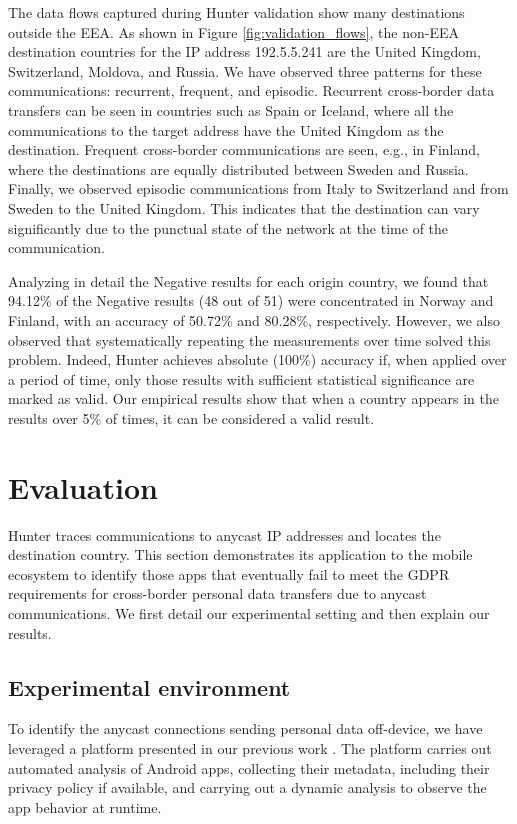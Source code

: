 \documentclass[preprint,12pt]{elsarticle}
\begin{document}
The data flows captured during Hunter validation show many destinations outside the EEA. As shown in Figure \ref{fig:validation_flows}, the non-EEA destination countries for the IP address 192.5.5.241 are the United Kingdom, Switzerland, Moldova, and Russia. We have observed three patterns for these communications: recurrent, frequent, and episodic. Recurrent cross-border data transfers can be seen in countries such as Spain or Iceland, where all the communications to the target address have the United Kingdom as the destination. Frequent cross-border communications are seen, e.g., in Finland, where the destinations are equally distributed between Sweden and Russia. Finally, we observed episodic communications from Italy to Switzerland and from Sweden to the United Kingdom. This indicates that the destination can vary significantly due to the punctual state of the network at the time of the communication. 

Analyzing in detail the Negative results for each origin country, we found that 94.12\% of the Negative results (48 out of 51) were concentrated in Norway and Finland, with an accuracy of 50.72\% and 80.28\%, respectively. However, we also observed that systematically repeating the measurements over time solved this problem. Indeed, Hunter achieves absolute (100\%) accuracy if, when applied over a period of time, only those results with sufficient statistical significance are marked as valid. Our empirical results show that when a country appears in the results over 5\% of times, it can be considered a valid result.

\section{Evaluation} \label{sec:Evaluation}

Hunter traces communications to anycast IP addresses and locates the destination country. This section demonstrates its application to the mobile ecosystem to identify those apps that eventually fail to meet the GDPR requirements for cross-border personal data transfers due to anycast communications. We first detail our experimental setting and then explain our results.

\subsection{Experimental environment}

To identify the anycast connections sending personal data off-device, we have leveraged a platform presented in our previous work \cite{Guaman2023AutomatedApplications}. The platform carries out automated analysis of Android apps, collecting their metadata, including their privacy policy if available, and carrying out a dynamic analysis to observe the app behavior at runtime.
\end{document}
